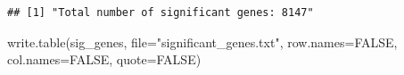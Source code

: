 \documentclass[
]{article}
\newenvironment{Shaded}{\begin{snugshade}}{\end{snugshade}}
\newcommand{\AttributeTok}[1]{\textcolor[rgb]{0.77,0.63,0.00}{#1}}
\newcommand{\ConstantTok}[1]{\textcolor[rgb]{0.00,0.00,0.00}{#1}}
\newcommand{\FunctionTok}[1]{\textcolor[rgb]{0.00,0.00,0.00}{#1}}
\newcommand{\NormalTok}[1]{#1}
\newcommand{\StringTok}[1]{\textcolor[rgb]{0.31,0.60,0.02}{#1}}
\begin{document}
\begin{verbatim}
## [1] "Total number of significant genes: 8147"
\end{verbatim}

\begin{Shaded}
\begin{Highlighting}[]
\FunctionTok{write.table}\NormalTok{(sig\_genes, }\AttributeTok{file=}\StringTok{"significant\_genes.txt"}\NormalTok{, }\AttributeTok{row.names=}\ConstantTok{FALSE}\NormalTok{, }\AttributeTok{col.names=}\ConstantTok{FALSE}\NormalTok{, }\AttributeTok{quote=}\ConstantTok{FALSE}\NormalTok{)}
\end{Highlighting}
\end{Shaded}
\end{document}
